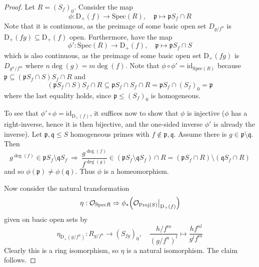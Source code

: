 \documentclass{scrartcl}
\newcommand{\D}[1]{\mathrm{D}_+(#1)}
\newcommand{\p}{\mathfrak{p}}
\newcommand{\q}{\mathfrak{q}}
\newcommand{\Spec}{\mathrm{Spec}}
\newcommand{\Proj}{\mathrm{Proj}}
\renewcommand{\O}{\mathcal{O}}
\newcommand\restr[2]{{
    \left.\kern-\nulldelimiterspace
    #1
    \vphantom{\big|}
    \right|_{#2}
}}
\theoremstyle{definition}
\begin{document}
\begin{proof}
    Let $R = (S_f)_0$.
    Consider the map
    \begin{equation*}
        \phi: \D{f} \to \Spec(R), \quad \p \mapsto \p S_f \cap R
    \end{equation*}
    Note that it is continuous, as the preimage of some basic open set $D_{g/f^n}$ is $\D{fg} \subseteq \D{f}$ open.
    Furthermore, have the map
    \begin{equation*}
        \phi': \Spec(R) \to \D{f}, \quad \p \mapsto \p S_f \cap S
    \end{equation*}
    which is also continuous, as the preimage of some basic open set $\D{fg}$ is $D_{g^n/f^m}$ where $n\deg(g) = m\deg(f)$.
    Note that $\phi \circ \phi' = \mathrm{id}_{\Spec(R)}$ because $\p \subseteq (\p S_f \cap S) S_f \cap R$ and
    \begin{equation*}
        (\p S_f \cap S) S_f \cap R \subseteq \p S_f \cap S_f \cap R = \p S_f \cap (S_f)_0 = \p
    \end{equation*}
    where the last equality holds, since $\p \leq (S_f)_0$ is homogeneous.
    
    To see that $\phi' \circ \phi = \mathrm{id}_{\D{f}}$, it suffices now to show that $\phi$ is injective ($\phi$ has a right-inverse, hence it is then bijective, and the one-sided inverse $\phi'$ is already the inverse).
    Let $\p, \q \leq S$ homogeneous primes with $f \notin \p, \q$.
    Assume there is $g \in \p \setminus \q$.
    Then
    \begin{equation*}
        g^{\deg(f)} \in \p S_f \setminus \q S_f  \ \Rightarrow \ \frac {g^{\deg(f)}} {f^{\deg(g)}} \in (\p S_f \setminus \q S_f) \cap R = (\p S_f \cap R) \setminus (\q S_f \cap R)
    \end{equation*}
    and so $\phi(\p) \neq \phi(\q)$. Thus $\phi$ is a homeomorphism.

    Now consider the natural transformation
    \begin{equation*}
        \eta: \O_{\Spec R} \Rightarrow \phi_*\Bigl( \restr{\O_{\Proj(S)}}{\D{f}} \Bigr)
    \end{equation*}
    given on basic open sets by
    \begin{equation*}
        \eta_{\D{g/f^n}}: R_{g/f^n} \to (S_{fg})_0, \quad \frac {h/f^m} {(g/f^n)^l} \mapsto \frac {h f^{nl}} {g^l f^m}
    \end{equation*}
    Clearly this is a ring isomorphism, so $\eta$ is a natural isomorphism.
    The claim follows.
\end{proof}
\end{document}
